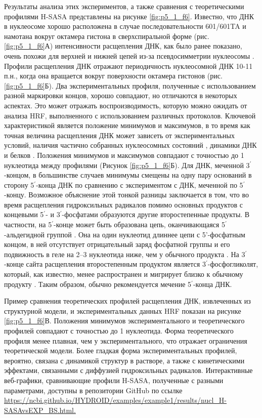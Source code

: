     Результаты анализа этих экспериментов, а также сравнения с теоретическими профилями H-SASA представлены на рисунке \ref{fig:p5_1_f6}. Известно, что ДНК в нуклеосоме хорошо расположена в случае последовательности 601/601TA и намотана вокруг октамера гистона в сверхспиральной форме (рис. \ref{fig:p5_1_f6}А) интенсивности расщепления ДНК, как было ранее показано, очень похожи для верхней и нижней цепей из-за псевдосимметрии нуклеосомы \cite{shaytan_hydroxyl-radical_2017}. Профили расщепления ДНК отражают периодичность нуклеосомной ДНК 10-11 п.н., когда она вращается вокруг поверхности октамера гистонов (рис. \ref{fig:p5_1_f6}Б). Два экспериментальных профиля, полученные с использованием разной маркировки концов, хорошо совпадают, но отличаются в некоторых аспектах. Это может отражать воспроизводимость, которую можно ожидать от анализа HRF, выполненного с использованием различных протоколов. Ключевой характеристикой является положение минимумов и максимумов, в то время как точная величина расщепления ДНК может зависеть от экспериментальных условий, наличия частично собранных нуклеосомных состояний \cite{rychkov_partially_2017}, динамики ДНК и белков \cite{eslami-mossallam_nucleosome_2016}. Положения минимумов и максимумов совпадают с точностью до 1 нуклеотида между профилями (Рисунок \ref{fig:p5_1_f6}Б). Для ДНК, меченной 3$^\prime$-концом, в большинстве случаев минимумы смещены на одну пару оснований в сторону 5$^\prime$-конца ДНК по сравнению с экспериментом с ДНК, меченной по 5$^\prime$-концу. Возможное объяснение этой тонкой разницы заключается в том, что во время расщепления гидроксильных радикалов помимо основных продуктов с концевыми 5$^\prime$- и 3$^\prime$-фосфатами образуются другие второстепенные продукты. В частности, на 5$^\prime$-конце может быть образована цепь, оканчивающаяся 5$^\prime$-альдегидной группой \cite{balasubramanian_dna_1998}. Она на один нуклеотид длиннее цепи с 5'-фосфатным концом, в ней отсутствует отрицательный заряд фосфатной группы и его подвижность в геле на 2–3 нуклеотида ниже, чем у обычного продукта \cite{kappen_deoxyribonucleic_1983}. На 3$^\prime$-конце сайта расщепления второстепенным продуктом является 3$^\prime$-фосфогликолят, который, как известно, менее распространен и мигрирует близко к обычному продукту \cite{balasubramanian_dna_1998}. Таким образом, обычно рекомендуется мечение 5$^\prime$-конца ДНК.
    
    Пример сравнения теоретических профилей расщепления ДНК, извлеченных из структурной модели, и экспериментальных данных HRF показан на рисунке \ref{fig:p5_1_f6}В. Положения минимумов экспериментального и теоретического профилей совпадают с точностью до 1 нуклеотида. Форма теоретического профиля менее плавная, чем у экспериментального, что отражает ограничения теоретической модели. Более гладкая форма экспериментальных профилей, вероятно, связана с динамикой структур в растворе, а также с кинетическими эффектами, связанными с диффузией гидроксильных радикалов. Интерактивные веб-графики, сравнивающие профили H-SASA, полученные с разными параметрами, доступны в репозитории GitHub по ссылке \url{https://ncbi.github.io/HYDROID/examples/example1/results/nucl_H-SASAvsEXP_BS.html.} 
    
